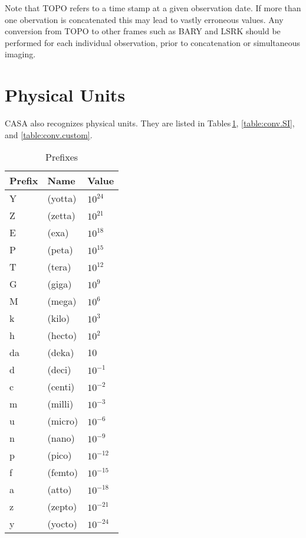 Note that TOPO refers to a time stamp at a given observation date. If
more than one obervation is concatenated this may lead to vastly
erroneous values. Any conversion from TOPO to other frames such as
BARY and LSRK should be performed for each individual observation,
prior to concatenation or simultaneous imaging.

\section{Physical Units}

\label{section:conv.units}

CASA also recognizes physical units. They are listed in
Tables\,\ref{table:conv.prefixes}, \ref{table:conv.SI},
and \ref{table:conv.custom}.

\begin{table}[htb]
\caption{Prefixes \label{table:conv.prefixes}}
\begin{center}
\begin{tabular}{lll}
Prefix & Name & Value\\
\hline
    Y  &         (yotta)  &                    $10^{24}$\\
    Z  &         (zetta)  &                    $10^{21}$\\
    E  &         (exa)    &                    $10^{18}$ \\
    P  &         (peta)   &                    $10^{15}$\\
    T  &         (tera)   &                    $10^{12}$\\
    G  &         (giga)   &                    $10^{9}$\\
    M  &         (mega)   &                    $10^{6}$\\
    k  &         (kilo)   &                    $10^{3}$\\
    h  &         (hecto)  &                    $10^{2}$\\
    da &         (deka)   &                    10\\
    d  &         (deci)   &                    $10^{-1}$\\
    c  &         (centi)  &                    $10^{-2}$\\
    m  &         (milli)  &                    $10^{-3}$\\
    u  &         (micro)  &                    $10^{-6}$\\
    n  &         (nano)   &                    $10^{-9}$\\
    p  &         (pico)   &                    $10^{-12}$\\
    f  &         (femto)  &                    $10^{-15}$\\
    a  &         (atto)   &                    $10^{-18}$\\
    z  &         (zepto)  &                    $10^{-21}$\\
    y  &         (yocto)  &                    $10^{-24}$\\

\end{tabular}
\end{center}
\end{table}




